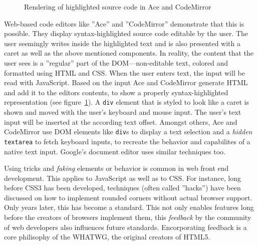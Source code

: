 \begin{figure}[!htb]
\centering
{}
\caption{Rendering of highlighted source code in Ace and CodeMirror}
\label{fig:ace_rendering_uml}
\end{figure}


Web-based code editors like ''Ace'' and ''CodeMirror'' demonstrate that this is possible. They display syntax-highlighted source code editable by the user. The user seemingly writes inside the highlighted text and is also presented with a caret as well as the above mentioned components. In reality, the content that the user sees is a ''regular'' part of the DOM---non-editable text, colored and formatted using HTML and CSS. When the user enters text, the input will be read with JavaScript. Based on the input Ace and CodeMirror generate HTML and add it to the editors contents, to show a properly syntax-highlighted representation (see figure~\ref{fig:ace_rendering_uml}). A \texttt{div} element that is styled to look like a caret is shown and moved with the user's keyboard and mouse input. The user's text input will be inserted at the according text offset. Amongst others, Ace and CodeMirror use DOM elements like \texttt{div}s to display a text selection and a \textit{hidden} \texttt{textarea} to fetch keyboard inputs, to recreate the behavior and capabilites of a native text input. Google's document editor uses similar techniques too.




Using tricks and \textit{faking} elements or behavior is common in web front end development. This applies to JavaScript as well as to CSS. For instance, long before CSS3 has been developed, techniques (often called ''hacks'') have been discussed on how to implement rounded corners without actual browser support. Only years later, this has become a standard. This not only enables features long before the creators of browsers implement them, this \textit{feedback} by the community of web developers also influences future standards. Encorporating feedback is a core philisophy of the WHATWG, the original creators of HTML5.


